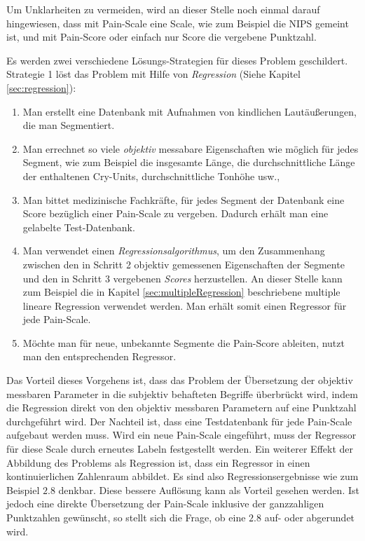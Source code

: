 Um Unklarheiten zu vermeiden, wird an dieser Stelle noch einmal darauf hingewiesen, dass mit \glqq Pain-Scale\grqq{} eine Scale, wie zum Beispiel die NIPS gemeint ist, und mit \glqq Pain-Score\glqq{} oder einfach nur \glqq Score\grqq{} die vergebene Punktzahl.

Es werden zwei verschiedene Lösungs-Strategien für dieses Problem geschildert.  Strategie 1 löst das Problem mit Hilfe von \emph{Regression} (Siehe Kapitel \ref{sec:regression}):
\begin{enumerate}
 \item Man erstellt eine Datenbank mit Aufnahmen von kindlichen Lautäußerungen, die man Segmentiert. 
 \item Man errechnet so viele \emph{objektiv} messabare Eigenschaften wie möglich für jedes Segment, wie zum Beispiel die insgesamte Länge, die durchschnittliche Länge der enthaltenen Cry-Units, durchschnittliche Tonhöhe usw., 
 \item Man bittet medizinische Fachkräfte, für jedes Segment der Datenbank eine Score bezüglich einer Pain-Scale zu vergeben. Dadurch erhält man eine gelabelte Test-Datenbank.
 \item  Man verwendet einen \emph{Regressionsalgorithmus}, um den Zusammenhang zwischen den in Schritt 2 objektiv gemessenen Eigenschaften der Segmente und den in Schritt 3 vergebenen \emph{Scores} herzustellen. An dieser Stelle kann zum Beispiel die in Kapitel \ref{sec:multipleRegression} beschriebene multiple lineare Regression verwendet werden. Man erhält somit einen Regressor für jede Pain-Scale.
 \item Möchte man für neue, unbekannte Segmente die Pain-Score ableiten, nutzt man den entsprechenden Regressor.
\end{enumerate}

Das Vorteil dieses Vorgehens ist, dass das Problem der Übersetzung der objektiv messbaren Parameter in die subjektiv behafteten Begriffe überbrückt wird, indem die Regression direkt von den objektiv messbaren Parametern auf eine Punktzahl durchgeführt wird. Der Nachteil ist, dass eine Testdatenbank für jede Pain-Scale aufgebaut werden muss. Wird ein neue Pain-Scale eingeführt, muss der Regressor für diese Scale durch erneutes Labeln festgestellt werden. Ein weiterer Effekt der Abbildung des Problems als Regression ist, dass ein Regressor in einen kontinuierlichen Zahlenraum abbildet. Es sind also Regressionsergebnisse wie zum Beispiel $2.8$ denkbar. Diese \glqq bessere Auflösung\grqq{} kann als Vorteil gesehen werden. Ist jedoch eine direkte Übersetzung der Pain-Scale inklusive der ganzzahligen Punktzahlen gewünscht, so stellt sich die Frage, ob eine $2.8$ auf- oder abgerundet wird.

